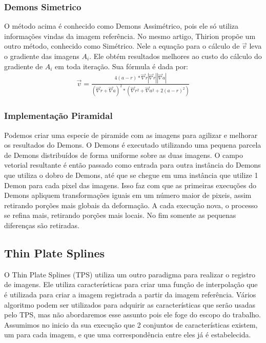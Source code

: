 \documentclass[]{spie}  %
\begin{document}
\subsubsection{Demons Simetrico}
	O método acima é conhecido como Demons Assimétrico, pois ele só utiliza informações vindas
da imagem referência. No mesmo artigo, Thirion propõe um outro método, conhecido como Simétrico.
Nele a equação para o cálculo de $\vec{v}$ leva o gradiente das imagens $A_i$. Ele obtém resultados
melhores ao custo do cálculo do gradiente de $A_i$ em toda iteração. Sua fórmula é dada por:
\begin{align}
	\vec{v} = \frac{4(a - r)*\vec{\nabla}r|\vec{\nabla}r||\vec{\nabla}a|}
					{(\vec{\nabla}r+\vec{\nabla}a)^2*(\vec{\nabla}r^2 + \vec{\nabla}a^2 + 2(a - r)^2)}
\end{align}

\subsubsection{Implementação Piramidal}
	Podemos criar uma especie de piramide com as imagens para agilizar e melhorar os resultados do Demons.
O Demons é executado utilizando uma pequena parcela de Demons distribuídos de forma uniforme sobre as duas imagens.
O campo vetorial resultante é então passado como entrada para outra instância do Demons que utiliza o dobro de Demons,
até que se chegue em uma instância que utilize 1 Demon para cada pixel das imagens.
	Isso faz com que as primeiras execuções do Demons apliquem transformações iguais em um número maior de pixeis,
assim retirando porções mais globais da deformação. A cada execução nova, o processo se refina mais, retirando porções 
mais locais. No fim somente as pequenas diferenças são retiradas.

\subsection{Thin Plate Splines}
	O Thin Plate Splines (TPS) utiliza um outro paradigma para realizar o registro de imagens. Ele utiliza
características para criar uma função de interpolação que é utilizada para criar a imagem registrada a partir
da imagem referência. Vários algoritmo podem ser utilizados para adquirir as características que serão usadas
pelo TPS, mas não abordaremos esse assunto pois ele foge do escopo do trabalho. Assumimos no inicio da sua
execução que 2 conjuntos de características existem, um para cada imagem, e que uma correspondência entre
eles já é estabelecida.
\end{document}
